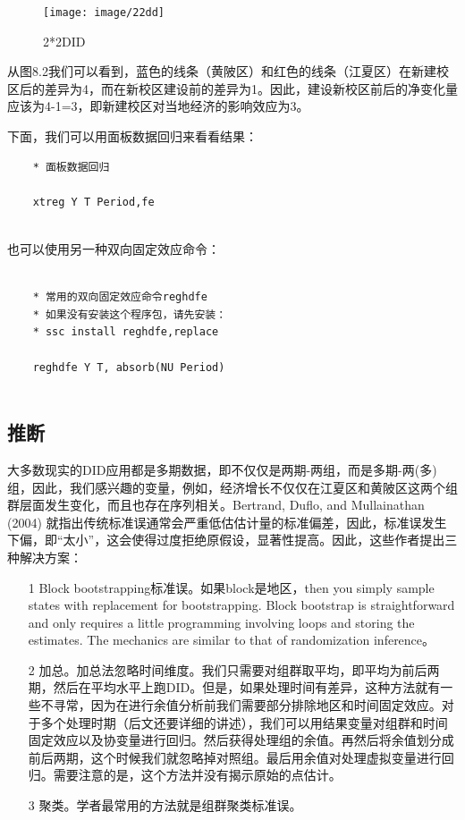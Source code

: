 \documentclass[cn,12pt,math=newtx,citestyle=gb7714-2015,bibstyle=gb7714-2015]{elegantbook}
\begin{document}
	\begin{figure}[tbph]
		\centering
		\texttt{[image: image/22dd]}
		\caption{2*2DID}
		\label{fig:22dd}
	\end{figure}

从图8.2我们可以看到，蓝色的线条（黄陂区）和红色的线条（江夏区）在新建校区后的差异为4，而在新校区建设前的差异为1。因此，建设新校区前后的净变化量应该为4-1=3，即新建校区对当地经济的影响效应为3。

下面，我们可以用面板数据回归来看看结果：

	\begin{lstlisting}
	* 面板数据回归
	
	xtreg Y T Period,fe
	
\end{lstlisting}

也可以使用另一种双向固定效应命令：

\begin{lstlisting}
	
	* 常用的双向固定效应命令reghdfe
	* 如果没有安装这个程序包，请先安装：
	* ssc install reghdfe,replace
	
	reghdfe Y T, absorb(NU Period)
	
\end{lstlisting}

\subsection{推断}

大多数现实的DID应用都是多期数据，即不仅仅是两期-两组，而是多期-两(多)组，因此，我们感兴趣的变量，例如，经济增长不仅仅在江夏区和黄陂区这两个组群层面发生变化，而且也存在序列相关。Bertrand, Duflo, and Mullainathan (2004) 就指出传统标准误通常会严重低估估计量的标准偏差，因此，标准误发生下偏，即“太小”，这会使得过度拒绝原假设，显著性提高。因此，这些作者提出三种解决方案：

\begin{itemize}
	\item[1] Block bootstrapping标准误。如果block是地区，then you simply sample states with replacement for bootstrapping. Block bootstrap is straightforward and only requires a little programming involving loops and storing the estimates. The mechanics are similar to that of randomization inference。
	\item[2] 加总。加总法忽略时间维度。我们只需要对组群取平均，即平均为前后两期，然后在平均水平上跑DID。但是，如果处理时间有差异，这种方法就有一些不寻常，因为在进行余值分析前我们需要部分排除地区和时间固定效应。对于多个处理时期（后文还要详细的讲述），我们可以用结果变量对组群和时间固定效应以及协变量进行回归。然后获得处理组的余值。再然后将余值划分成前后两期，这个时候我们就忽略掉对照组。最后用余值对处理虚拟变量进行回归。需要注意的是，这个方法并没有揭示原始的点估计。
	\item[3] 聚类。学者最常用的方法就是组群聚类标准误。
\end{itemize}
\end{document}
